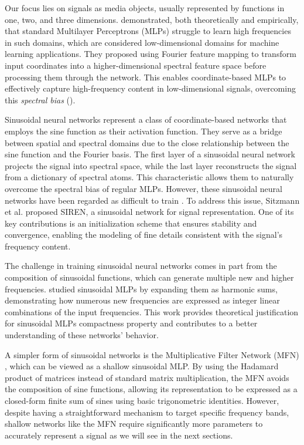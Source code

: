 Our focus lies on signals as media objects, usually represented by functions in one, two, and three dimensions. \cite{tancik2020fourfeat} demonstrated, both theoretically and empirically, that standard Multilayer Perceptrons (MLPs) struggle to learn high frequencies in such domains, which are considered low-dimensional domains for machine learning applications. They proposed using Fourier feature mapping to transform input coordinates into a higher-dimensional spectral feature space before processing them through the network. This enables coordinate-based MLPs to effectively capture high-frequency content in low-dimensional signals, overcoming this \textit{spectral bias} (\cite{rahaman2018spectral}).

Sinusoidal neural networks represent a class of coordinate-based networks that employs the sine function as their activation function. They serve as a bridge between spatial and spectral domains due to the close relationship between the sine function and the Fourier basis. The first layer of a sinusoidal neural network projects the signal into spectral space, while the last layer reconstructs the signal from a dictionary of spectral atoms. This characteristic allows them to naturally overcome the spectral bias of regular MLPs. However, these sinusoidal neural networks have been regarded as difficult to train \cite{taming2017}. To address this issue, Sitzmann et al. \cite{sitzmann2019siren} proposed SIREN, a sinusoidal network for signal representation. One of its key contributions is an initialization scheme that ensures stability and convergence, enabling the modeling of fine details consistent with the signal’s frequency content.

The challenge in training sinusoidal neural networks comes in part from the composition of sinusoidal functions, which can generate multiple new and higher frequencies. \cite{novello2022understanding} studied sinusoidal MLPs by expanding them as harmonic sums, demonstrating how numerous new frequencies are expressed as integer linear combinations of the input frequencies. This work provides theoretical justification for sinusoidal MLPs compactness property and contributes to a better understanding of these networks’ behavior.

A simpler form of sinusoidal networks is the Multiplicative Filter Network (MFN) \cite{fathony2020multiplicative}, which can be viewed as a shallow sinusoidal MLP. By using the Hadamard product of matrices instead of standard matrix multiplication, the MFN avoids the composition of sine functions, allowing its representation to be expressed as a closed-form finite sum of sines using basic trigonometric identities. However, despite having a straightforward mechanism to target specific frequency bands, shallow networks like the MFN require significantly more parameters to accurately represent a signal as we will see in the next sections.

